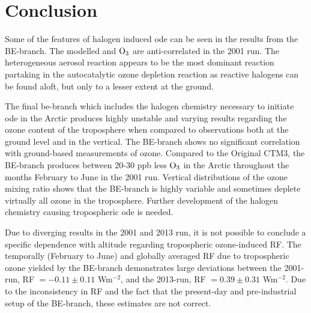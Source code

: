 \setcounter{chapter}{7}
\chapter{Conclusion}\label{Chap:conclusion}


Some of the features of halogen induced \acrfull{ode} can be seen in the results from the BE-branch. The modelled  and $\mathrm{O_3}$ are anti-correlated in the 2001 run. The heterogeneous aerosol reaction appears to be the most dominant reaction partaking in the autocatalytic ozone depletion reaction as reactive halogens can be found aloft, but only to a lesser extent at the ground. 

\medskip

The final \acrfull{be}-branch which includes the halogen chemistry necessary to initiate \acrshort{ode} in the Arctic produces highly unstable and varying results regarding the ozone content of the troposphere when compared to observations both at the ground level and in the vertical. The BE-branch shows no significant correlation with ground-based measurements of ozone. Compared to the Original CTM3, the BE-branch produces between 20-30 ppb less $\mathrm{O_3}$ in the Arctic throughout the months February to June in the 2001 run. Vertical distributions of the ozone mixing ratio shows that the BE-branch is highly variable and sometimes deplete virtually all ozone in the troposphere. Further development of the halogen chemistry causing tropospheric \acrshort{ode} is needed.


\medskip

Due to diverging results in the 2001 and 2013 run, it is not possible to conclude a specific dependence with altitude regarding tropospheric ozone-induced RF. The temporally (February to June) and globally averaged RF due to tropospheric ozone yielded by the BE-branch demonstrates large deviations between the 2001-run, RF $=-0.11\pm0.11$ Wm$^{-2}$, and the 2013-run, RF $= 0.39\pm0.31$ Wm$^{-2}$. Due to the inconsistency in RF and the fact that the present-day and pre-industrial setup of the BE-branch, these estimates are not correct. 